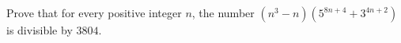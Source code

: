 Prove that for every positive integer $n$, the number $\left(n^3-n\right)\left(5^{8n+4}+3^{4n+2}\right)$ is divisible by $3804$.
